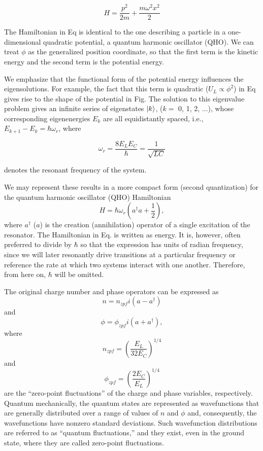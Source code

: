 \documentclass[11pt, oneside]{article}   	%
\begin{document}
\begin{equation*} 
H = \frac{p^2}{2 m} + \frac{m \omega^2 x^2}{2}
\end{equation*}


The Hamiltonian in Eq is identical to the one describing a particle in a one-dimensional quadratic potential, a quantum harmonic oscillator (QHO). 
We can treat $\phi$ as the generalized position coordinate, so that the first term is the kinetic energy and the second term is the potential energy. 

We emphasize that the functional form of the potential energy influences the eigensolutions. 
For example, the fact that this term is quadratic ($U_L \propto \phi^2$) in Eq gives rise to the shape of the potential in Fig. 
The solution to this eigenvalue problem gives an infinite series of eigenstates 
$\ket{k}$, ($k = $ 0, 1, 2, $\dots$),
whose corresponding eigenenergies $E_k$ are all equidistantly spaced, i.e., 
$E_{k+1} - E_k = \hbar \omega_r$, where

\begin{equation*} 
\omega_r = \frac{8 E_L E_C}{\hbar} = \frac{1}{\sqrt{LC}}
\end{equation*}

denotes the resonant frequency of the system.

We may represent these results in a more compact form (second quantization) for the quantum harmonic oscillator (QHO) Hamiltonian
\begin{equation*} 
H = \hbar \omega_r \left( a^{\dagger} a + \frac{1}{2} \right), 
\end{equation*}
where $a^{\dagger}$ ($a$) is the creation (annihilation) operator of a single excitation of the resonator. 
The Hamiltonian in Eq. is written as energy. 
It is, however, often preferred to divide by $\hbar$ so that the expression has units of radian frequency, 
since we will later resonantly drive transitions at a particular frequency or reference the rate at which two systems interact with one another. 
Therefore, from here on, $\hbar$ will be omitted.

The original charge number and phase operators can be expressed as 
\begin{equation*} 
n = n_{zpf} i (a - a^{\dagger} )
\end{equation*}
and
\begin{equation*} 
\phi = \phi_{zpf} i (a + a^{\dagger} ),
\end{equation*}
where
\begin{equation*} 
n_{zpf} = \left( \frac{E_L}{32 E_C} \right)^{1/4}
\end{equation*}
and
\begin{equation*} 
\phi_{zpf} = \left( \frac{2 E_C}{E_L} \right)^{1/4}
\end{equation*}
are the ``zero-point fluctuations'' of the charge and phase variables, respectively. 
Quantum mechanically, the quantum states are represented as wavefunctions that are generally distributed over a range of values of $n$ and $\phi$ and, consequently, the wavefunctions have nonzero standard deviations. 
Such wavefunction distributions are referred to as ``quantum fluctuations,'' and they exist, even in the ground state, where they are called zero-point fluctuations.
\end{document}
